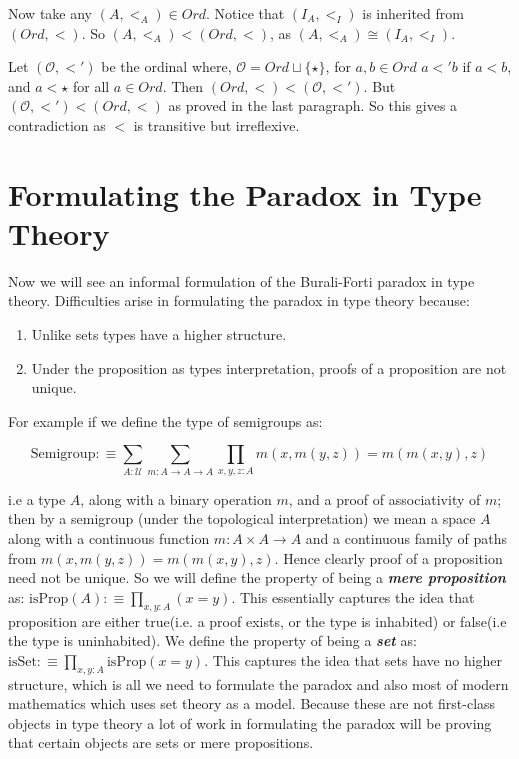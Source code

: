 \documentclass[10pt]{article}
\theoremstyle{definition}
\theoremstyle{plain}
\theoremstyle{remark}
\newcommand{\U}{\mathscr{U}}
\begin{document}
Now take any $(A, <_A)\in Ord$. Notice that $(I_A, <_I)$ is inherited from ${(Ord, <)}$. So
$(A, <_A) < (Ord, <)$, as $(A,<_A) \cong (I_A, <_I)$.\smallskip

Let $(\mathcal{O}, <')$ be the ordinal where, $\mathcal{O} = Ord\sqcup \{\star\}$, for 
$a,b\in Ord$ $a<'b$ if $a<b$, and $a<\star$ for all $a\in Ord$. Then 
$(Ord,<)< (\mathcal{O},<')$. But $(\mathcal{O},<')<(Ord,<)$ as proved in the last paragraph.
So this gives a contradiction as $<$ is transitive but irreflexive. 

\section{Formulating the Paradox in Type Theory}\label{S:Form in TT}

Now we will see an informal formulation of the Burali-Forti paradox in type theory. 
Difficulties arise in formulating the paradox in type theory because:
\begin{enumerate}
\item Unlike sets types have a higher structure.
\item Under the proposition as types interpretation, proofs of a proposition are not unique.
\end{enumerate}

For example if we define the type of semigroups as:

\[ \text{Semigroup}:\equiv 	\sum_{A : \U} \sum_{m : A \to A \to A} 
    \prod_{x,y,z:A} m(x,m(y,z)) = m(m(x,y),z) \]
    
i.e a type $A$, along with a binary operation $m$, and a proof of associativity of $m$; then
by a semigroup (under the topological interpretation) we mean a space $A$ along with a
continuous function $m : A\times A \to A$ and a continuous family of paths from 
$m(x,m(y,z)) = m(m(x,y),z)$. Hence clearly proof of a proposition need not be unique. So
we will define the property of being a \textbf{\textit{mere proposition}} as:
${ \text{isProp}(A) :\equiv \prod_{x,y : A} (x = y) }$. This essentially captures the idea
that proposition are either true(i.e. a proof exists, or the type is inhabited) or false(i.e
the type is uninhabited). We define the property of being a \textbf{\textit{set}} as: 
${ \text{isSet} :\equiv \prod_{x,y:A} \text{isProp}(x=y)  }$. This captures the idea that sets
have no higher structure, which is all we need to formulate the paradox and also most of
modern mathematics which uses set theory as a model. Because these are not first-class 
objects in type theory a lot of work in formulating the paradox will be proving that certain
objects are sets or mere propositions.\smallskip
\end{document}
